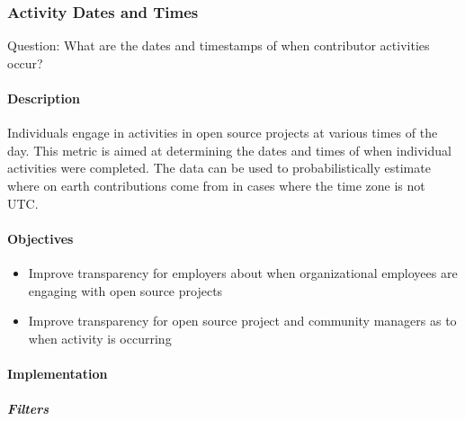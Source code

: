 \hypertarget{activity-dates-and-times}{%
\subsubsection{Activity Dates and
Times}\label{activity-dates-and-times}}

Question: What are the dates and timestamps of when contributor
activities occur?

\hypertarget{description}{%
\paragraph{Description}\label{description}}

Individuals engage in activities in open source projects at various
times of the day. This metric is aimed at determining the dates and
times of when individual activities were completed. The data can be used
to probabilistically estimate where on earth contributions come from in
cases where the time zone is not UTC.

\hypertarget{objectives}{%
\paragraph{Objectives}\label{objectives}}

\begin{itemize}
\tightlist
\item
  Improve transparency for employers about when organizational employees
  are engaging with open source projects
\item
  Improve transparency for open source project and community managers as
  to when activity is occurring
\end{itemize}

\hypertarget{implementation}{%
\paragraph{Implementation}\label{implementation}}

\hypertarget{filters}{%
\subparagraph{Filters}\label{filters}}

